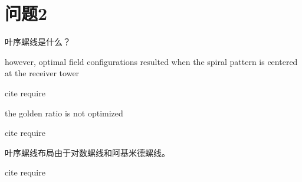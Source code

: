 \section{问题2}
叶序螺线是什么？


however, optimal field configurations resulted when
the spiral pattern is centered at the receiver tower

cite require

the golden ratio is not optimized

cite require

叶序螺线布局由于对数螺线和阿基米德螺线。

cite require
